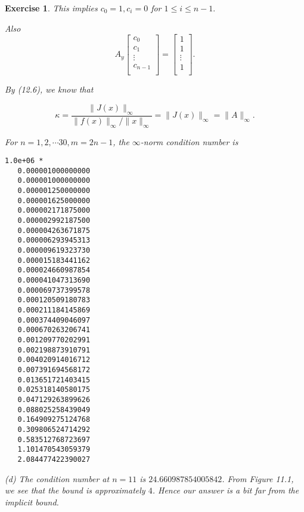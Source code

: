 \documentclass[paper=a4, fontsize=11pt]{scrartcl} %
\numberwithin{equation}{section} %
\numberwithin{figure}{section} %
\numberwithin{table}{section} %
\newtheorem{exercise}{Exercise}
\numberwithin{exercise}{section}
\begin{document}
\begin{exercise}
This implies $c_0=1, c_{i}=0$  for $1\leq i \leq n-1.$

Also $$A_{y}\begin{bmatrix}
c_0\\
c_1\\
\vdots\\
c_{n-1}\\
\end{bmatrix}=\begin{bmatrix}
1\\
1\\
\vdots\\
1\\
\end{bmatrix}.$$

By (12.6), we know that 

$$\kappa=\frac{\|J(x)\|_{\infty}}{\|f(x)\|_{\infty}/\|x\|_{\infty}}=\|J(x)\|_{\infty}=\|A\|_{\infty}.$$

For $n=1,2,\cdots 30, m=2n-1$, the $\infty$-norm condition number is 
\begin{verbatim}
1.0e+06 *
   0.000001000000000
   0.000001000000000
   0.000001250000000
   0.000001625000000
   0.000002171875000
   0.000002992187500
   0.000004263671875
   0.000006293945313
   0.000009619323730
   0.000015183441162
   0.000024660987854
   0.000041047313690
   0.000069737399578
   0.000120509180783
   0.000211184145869
   0.000374409046097
   0.000670263206741
   0.001209770202991
   0.002198873910791
   0.004020914016712
   0.007391694568172
   0.013651721403415
   0.025318140580175
   0.047129263899626
   0.088025258439049
   0.164909275124768
   0.309806524714292
   0.583512768723697
   1.101470543059379
   2.084477422390027
\end{verbatim}

(d) The condition number at $n=11$ is $24.660987854005842$. From Figure 11.1, we see that the bound is approximately $4$. Hence our answer is a bit far from the implicit bound.
\end{exercise}
\end{document}
